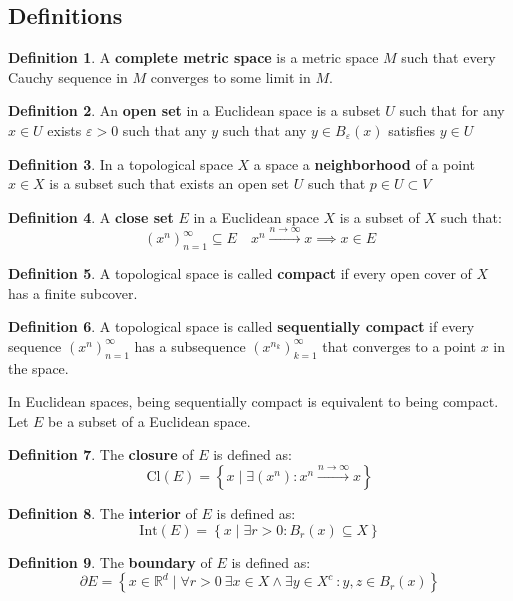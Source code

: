 \documentclass[11pt,a4paper]{article}
\theoremstyle{definition}
\newtheorem{definition}{Definition}[section]
\theoremstyle{plain}
\newcommand{\R}{\mathbb{R}}
\newcommand{\set}[2]{ \left\{ #1 \mid #2 \right\} }
\begin{document}
	\newpage
	
	\subsection{Definitions}
	\begin{definition}
	A \textbf{complete metric space} is a metric space $M$ such that every
	Cauchy sequence in $M$ converges to some limit in $M$.
	\end{definition}
	\begin{definition}
	An \textbf{open set} in a Euclidean space is a subset $U$ such that
	for any $x \in U$ exists $\varepsilon > 0$ such that any $y$ such that
	any $y \in B_\varepsilon(x)$ satisfies $y\in U$
	\end{definition}
	\begin{definition}
	In a topological space $X$ a space a \textbf{neighborhood} of a point 
	$x\in X$ is a subset such that exists an open set $U$ such that 
	$p\in U\subset V$
	\end{definition}
	\begin{definition}
	A \textbf{close set} $E$ in a Euclidean space $X$ is a subset of $X$ such
	that:
	\[
		(x^n)_{n=1}^{\infty}\subseteq E \quad x^n \xrightarrow{n\to\infty} x
		\implies x \in E
	\]
	\end{definition}
	\begin{definition}
	A topological space is called \textbf{compact} if every open cover of 
	$X$ has a finite subcover.
	\end{definition}
	\begin{definition}
		A topological space is called \textbf{sequentially compact} if
		every sequence $(x^n)_{n=1}^{\infty}$ has a subsequence 
		$(x^{n_k})_{k=1}^{\infty}$ that converges to a point $x$ in the space.
	\end{definition}
	\noindent
	In Euclidean spaces, being sequentially compact is equivalent to being
	compact. Let $E$ be a subset of a Euclidean space.
	\begin{definition}
	The \textbf{closure} of $E$ is defined as:
	\[
		\mathrm{Cl}(E) = \set{x}{\exists (x^n) \colon 
		x^n \xrightarrow{n\to\infty} x}
	\]
	\end{definition}
	\begin{definition}
	The \textbf{interior} of $E$ is defined as:
	\[
		\mathrm{Int}(E) = \set{x}{\exists r > 0 \colon B_r(x) \subseteq X}
	\]
	\end{definition}
	\begin{definition}
	The \textbf{boundary} of $E$ is defined as:
	\[
		\partial E = \set{x\in\R^d}{\forall r > 0\
		\exists x \in X \land \exists y \in X^c\ : y,z\in B_r(x)}
	\]
	\end{definition}
\end{document}
